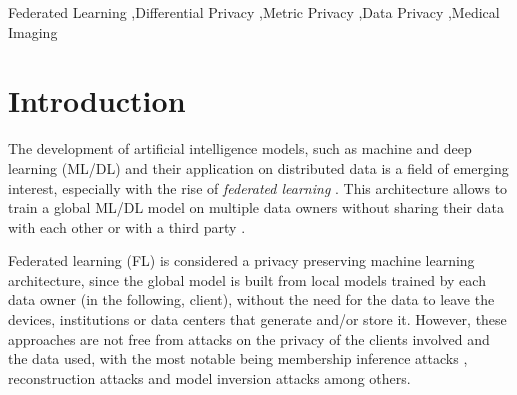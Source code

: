 \documentclass[5p,times]{elsarticle}
\begin{document}
\begin{frontmatter}
\begin{abstract}

\end{abstract}

\begin{keyword}
Federated Learning \sep Differential Privacy \sep Metric Privacy \sep Data Privacy \sep Medical Imaging 

\end{keyword}

\end{frontmatter}


\section{Introduction}\label{sec:intro}

The development of artificial intelligence models, such as machine and deep learning (ML/DL) and their application on distributed data is a field of emerging interest, especially with the rise of \emph{federated learning} \cite{li2020review}. This architecture allows to train a global ML/DL model on multiple data owners without sharing their data with each other or with a third party \cite{mcmahan2017communication}. 

Federated learning (FL) is considered a privacy preserving machine learning architecture, since the global model is built from local models trained by each data owner (in the following, client), without the need for the data to leave the devices, institutions or data centers that generate and/or store it. However, these approaches are not free from attacks on the privacy of the clients involved and the data used, with the most notable being  membership inference attacks \cite{mia_attack, sia_paper}, reconstruction attacks and model inversion attacks \cite{DLG, chen2022practical} among others. 
\end{document}
